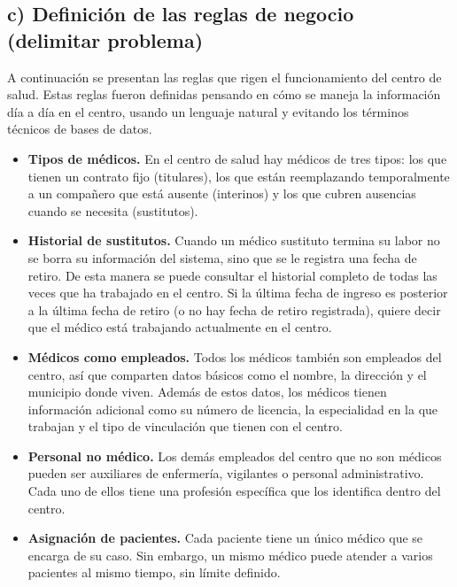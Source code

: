 \documentclass[12pt,a4paper]{article}
\begin{document}
\subsection{c) Definici\'on de las reglas de negocio (delimitar problema)}

A continuaci\'on se presentan las reglas que rigen el funcionamiento del centro de salud. Estas reglas fueron definidas pensando en c\'omo se maneja la informaci\'on d\'ia a d\'ia en el centro, usando un lenguaje natural y evitando los t\'erminos t\'ecnicos de bases de datos.

\begin{itemize}

    \item \textbf{Tipos de m\'edicos.} En el centro de salud hay m\'edicos de tres tipos: los que tienen un contrato fijo (titulares), los que est\'an reemplazando temporalmente a un compa\~nero que est\'a ausente (interinos) y los que cubren ausencias cuando se necesita (sustitutos).

    \item \textbf{Historial de sustitutos.} Cuando un m\'edico sustituto termina su labor no se borra su informaci\'on del sistema, sino que se le registra una fecha de retiro. De esta manera se puede consultar el historial completo de todas las veces que ha trabajado en el centro. Si la \'ultima fecha de ingreso es posterior a la \'ultima fecha de retiro (o no hay fecha de retiro registrada), quiere decir que el m\'edico est\'a trabajando actualmente en el centro.

    \item \textbf{M\'edicos como empleados.} Todos los m\'edicos tambi\'en son empleados del centro, as\'i que comparten datos b\'asicos como el nombre, la direcci\'on y el municipio donde viven. Adem\'as de estos datos, los m\'edicos tienen informaci\'on adicional como su n\'umero de licencia, la especialidad en la que trabajan y el tipo de vinculaci\'on que tienen con el centro.

    \item \textbf{Personal no m\'edico.} Los dem\'as empleados del centro que no son m\'edicos pueden ser auxiliares de enfermer\'ia, vigilantes o personal administrativo. Cada uno de ellos tiene una profesi\'on espec\'ifica que los identifica dentro del centro.

    \item \textbf{Asignaci\'on de pacientes.} Cada paciente tiene un \'unico m\'edico que se encarga de su caso. Sin embargo, un mismo m\'edico puede atender a varios pacientes al mismo tiempo, sin l\'imite definido.


\end{itemize}
\end{document}
